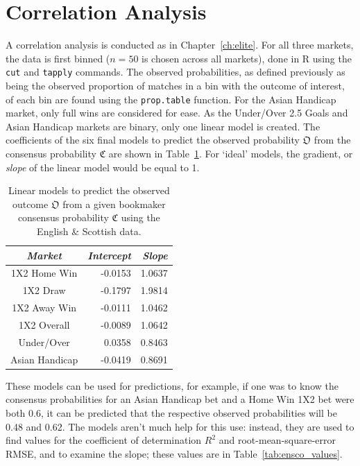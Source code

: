 \documentclass[a4paper,10pt]{report}
\begin{document}
\pagebreak

\section{Correlation Analysis} \label{sec:enscocorr}
A correlation analysis is conducted as in Chapter~\ref{ch:elite}. For all three markets, the data is first binned ($n=50$ is chosen across all markets), done in R using the \lstinline|cut| and \lstinline|tapply| commands. The observed probabilities, as defined previously as being the observed proportion of matches in a bin with the outcome of interest, of each bin are found using the \lstinline|prop.table| function. For the Asian Handicap market, only full wins are considered for ease. As the Under/Over 2.5 Goals and Asian Handicap markets are binary, only one linear model is created. The coefficients of the six final models to predict the observed probability $\mathfrak{O}$ from the consensus probability $\mathfrak{C}$ are shown in Table~\ref{tab:enscolinmods}. For `ideal' models, the gradient, or \textit{slope} of the linear model would be equal to 1.

\begin{table}[h!]\begin{center}\begin{tabular}{c||rr}
	\textit{Market} & \textit{Intercept}& \textit{Slope} \\ \hline\hline
	1X2 Home Win 	& -0.0153			& 1.0637 \\ 
	1X2 Draw		& -0.1797			& 1.9814 \\
	1X2 Away Win	& -0.0111			& 1.0462 \\
	1X2 Overall		& -0.0089			& 1.0642 \\ \hdashline
	Under/Over		&  0.0358			& 0.8463 \\
	Asian Handicap	& -0.0419			& 0.8691
\end{tabular}\end{center}\caption{Linear models to predict the observed outcome $\mathfrak{O}$ from a given bookmaker consensus probability $\mathfrak{C}$ using the English \& Scottish data.}\label{tab:enscolinmods}\end{table}

These models can be used for predictions, for example, if one was to know the consensus probabilities for an Asian Handicap bet and a Home Win 1X2 bet were both 0.6, it can be predicted that the respective observed probabilities will be 0.48 and 0.62. The models aren't much help for this use: instead, they are used to find values for the coefficient of determination $R^2$ and root-mean-square-error RMSE, and to examine the slope; these values are in Table~\ref{tab:ensco_values}. \vspace{3mm}
\end{document}
